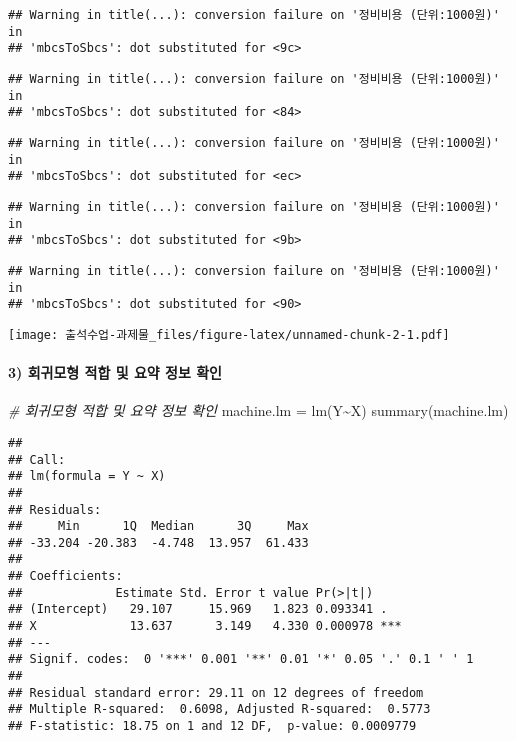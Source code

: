 \documentclass[
]{article}
\newenvironment{Shaded}{\begin{snugshade}}{\end{snugshade}}
\newcommand{\CommentTok}[1]{\textcolor[rgb]{0.56,0.35,0.01}{\textit{#1}}}
\newcommand{\FunctionTok}[1]{\textcolor[rgb]{0.00,0.00,0.00}{#1}}
\newcommand{\NormalTok}[1]{#1}
\newcommand{\OtherTok}[1]{\textcolor[rgb]{0.56,0.35,0.01}{#1}}
\newcommand{\SpecialCharTok}[1]{\textcolor[rgb]{0.00,0.00,0.00}{#1}}
\begin{document}
\begin{verbatim}
## Warning in title(...): conversion failure on '정비비용 (단위:1000원)' in
## 'mbcsToSbcs': dot substituted for <9c>
\end{verbatim}

\begin{verbatim}
## Warning in title(...): conversion failure on '정비비용 (단위:1000원)' in
## 'mbcsToSbcs': dot substituted for <84>
\end{verbatim}

\begin{verbatim}
## Warning in title(...): conversion failure on '정비비용 (단위:1000원)' in
## 'mbcsToSbcs': dot substituted for <ec>
\end{verbatim}

\begin{verbatim}
## Warning in title(...): conversion failure on '정비비용 (단위:1000원)' in
## 'mbcsToSbcs': dot substituted for <9b>
\end{verbatim}

\begin{verbatim}
## Warning in title(...): conversion failure on '정비비용 (단위:1000원)' in
## 'mbcsToSbcs': dot substituted for <90>
\end{verbatim}

\texttt{[image: 출석수업-과제물\_files/figure-latex/unnamed-chunk-2-1.pdf]}

\hypertarget{uxd68cuxadc0uxbaa8uxd615-uxc801uxd569-uxbc0f-uxc694uxc57d-uxc815uxbcf4-uxd655uxc778}{%
\paragraph{3) 회귀모형 적합 및 요약 정보
확인}\label{uxd68cuxadc0uxbaa8uxd615-uxc801uxd569-uxbc0f-uxc694uxc57d-uxc815uxbcf4-uxd655uxc778}}

\begin{Shaded}
\begin{Highlighting}[]
\CommentTok{\# 회귀모형 적합 및 요약 정보 확인}
\NormalTok{machine.lm }\OtherTok{=} \FunctionTok{lm}\NormalTok{(Y}\SpecialCharTok{\textasciitilde{}}\NormalTok{X)}
\FunctionTok{summary}\NormalTok{(machine.lm)}
\end{Highlighting}
\end{Shaded}

\begin{verbatim}
## 
## Call:
## lm(formula = Y ~ X)
## 
## Residuals:
##     Min      1Q  Median      3Q     Max 
## -33.204 -20.383  -4.748  13.957  61.433 
## 
## Coefficients:
##             Estimate Std. Error t value Pr(>|t|)    
## (Intercept)   29.107     15.969   1.823 0.093341 .  
## X             13.637      3.149   4.330 0.000978 ***
## ---
## Signif. codes:  0 '***' 0.001 '**' 0.01 '*' 0.05 '.' 0.1 ' ' 1
## 
## Residual standard error: 29.11 on 12 degrees of freedom
## Multiple R-squared:  0.6098, Adjusted R-squared:  0.5773 
## F-statistic: 18.75 on 1 and 12 DF,  p-value: 0.0009779
\end{verbatim}
\end{document}
